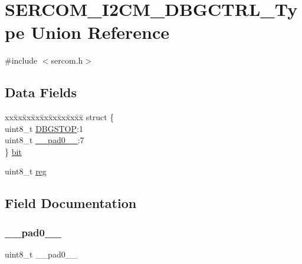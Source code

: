 \hypertarget{union_s_e_r_c_o_m___i2_c_m___d_b_g_c_t_r_l___type}{}\section{S\+E\+R\+C\+O\+M\+\_\+\+I2\+C\+M\+\_\+\+D\+B\+G\+C\+T\+R\+L\+\_\+\+Type Union Reference}
\label{union_s_e_r_c_o_m___i2_c_m___d_b_g_c_t_r_l___type}


{\ttfamily \#include $<$sercom.\+h$>$}

\subsection*{Data Fields}
\begin{DoxyCompactItemize}
\item 
\begin{tabbing}
xx\=xx\=xx\=xx\=xx\=xx\=xx\=xx\=xx\=\kill
struct \{\\
\>uint8\_t \mbox{\hyperlink{union_s_e_r_c_o_m___i2_c_m___d_b_g_c_t_r_l___type_ace8eb5df93c3176eb9283ab7f4b25bfb}{DBGSTOP}}:1\\
\>uint8\_t \mbox{\hyperlink{union_s_e_r_c_o_m___i2_c_m___d_b_g_c_t_r_l___type_a8b4eebe79ded0459acec2f4950102ba3}{\_\_pad0\_\_}}:7\\
\} \mbox{\hyperlink{union_s_e_r_c_o_m___i2_c_m___d_b_g_c_t_r_l___type_a459a3710b4d94b16bb37194fe03bdb1e}{bit}}\\

\end{tabbing}\item 
uint8\+\_\+t \mbox{\hyperlink{union_s_e_r_c_o_m___i2_c_m___d_b_g_c_t_r_l___type_a9428adc9af4653a2050e2536b55dec8d}{reg}}
\end{DoxyCompactItemize}


\subsection{Field Documentation}
\mbox{\label{union_s_e_r_c_o_m___i2_c_m___d_b_g_c_t_r_l___type_a8b4eebe79ded0459acec2f4950102ba3}} 
\subsubsection{\texorpdfstring{\_\_pad0\_\_}{\_\_pad0\_\_}}
{\footnotesize\ttfamily uint8\+\_\+t \+\_\+\+\_\+pad0\+\_\+\+\_\+}

